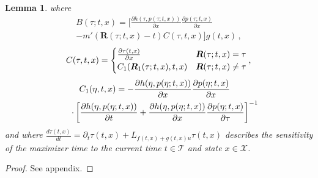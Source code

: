 \documentclass[10pt,conference]{ieeeconf}
\renewcommand{\(}{\left(}
\renewcommand{\)}{\right)}
\renewcommand{\[}{\left[}
\renewcommand{\]}{\right]}
\newtheorem{lemma}{Lemma}
\begin{document}
\begin{lemma}
\noindent
where
\begin{multline}
    B(\tau;t,x) = \bigg[ \frac{\partial h(\tau,p(\tau;t,x))}{\partial x}\frac{\partial p(\tau;t,x)}{\partial x} \\ - m'(\boldsymbol{R}(\tau;t,x) - t) C(\tau,t,x) \bigg] g(t,x) \,, \label{eq:def_B}
\end{multline}
\begin{equation}
    \hspace{-3pt} C(\tau,t,x) = \begin{cases} \frac{\partial \tau(t,x)}{\partial x} & \boldsymbol{R}(\tau;t,x) = \tau \\ C_1(\boldsymbol{R}_1(\tau;t,x),t,x) & \boldsymbol{R}(\tau;t,x) \neq \tau \end{cases} , \hspace{-2pt} \label{eq:def_C}
\end{equation}
\vspace{-6pt}
\begin{multline}
    \hspace{-10pt} C_1(\eta,t,x) = - \frac{\partial h(\eta,p(\eta;t,x))}{\partial x} \frac{\partial p(\eta;t,x)}{\partial x}\\ \cdot \left[ \frac{\partial h(\eta,p(\eta;t,x))}{\partial t}  + \frac{\partial h(\eta,p(\eta;t,x))}{\partial x}\frac{\partial p(\eta;t,x)}{\partial \tau} \right]^{-1} \hspace{-8pt}\hspace{-6pt} \label{eq:def_C1}
\end{multline}
and where $\frac{d\tau(t,x)}{dt} = \partial_t \tau(t,x) + L_{f(t,x) + g(t,x) u} \tau(t,x)$ describes the sensitivity of the maximizer time to the current time $t\in\mathcal{T}$ and state $x\in\mathcal{X}$.
\end{lemma}
\begin{proof}
See appendix.
\end{proof}
\end{document}
